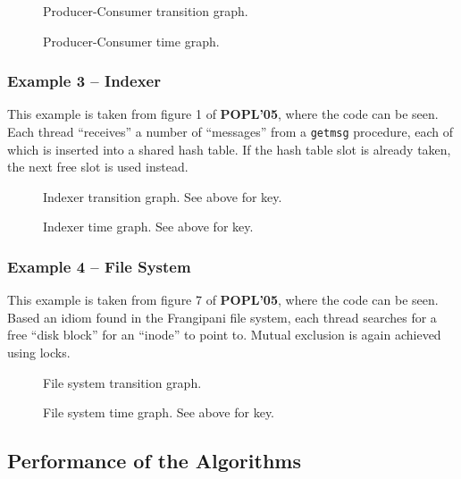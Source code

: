 \documentclass[12pt,a4paper,twoside,openright]{report}
\begin{document}
\begin{figure}
	\centering

	\def\svgwidth{15cm}
	
	\caption{Producer-Consumer transition graph.}
	\label{fig:prod-cons-time}

	\def\svgwidth{15cm}
	
	\caption{Producer-Consumer time graph.}
	\label{fig:prod-cons-trans}
\end{figure}

\subsubsection{Example 3 -- Indexer}
This example is taken from figure 1 of
\textbf{POPL'05},
where the code can be seen.
Each thread ``receives'' a number of
``messages'' from a \texttt{getmsg}
procedure, each of which is inserted
into a shared hash table. If the
hash table slot is already taken, the
next free slot is used instead.

\begin{figure}
	\centering

	\def\svgwidth{15cm}
	
	\caption{Indexer transition graph. See above for key.}
	\label{fig:indexer-trans}

	\def\svgwidth{15cm}
	
	\caption{Indexer time graph. See above for key.}
	\label{fig:indexer-time}
\end{figure}

\subsubsection{Example 4 -- File System}
This example is taken from figure 7 of
\textbf{POPL'05},
where the code can be seen.
Based an idiom found in the Frangipani file
system, each thread searches for a free
``disk block'' for an ``inode'' to point
to. Mutual exclusion is again achieved using
locks.

\begin{figure}
	\def\svgwidth{15cm}
	
	\caption{File system transition graph.}
	\label{fig:fs-trans}

	\def\svgwidth{15cm}
	
	\caption{File system time graph. See above for key.}
	\label{fig:fs-time}
\end{figure}

\subsection{Performance of the Algorithms}
\end{document}
